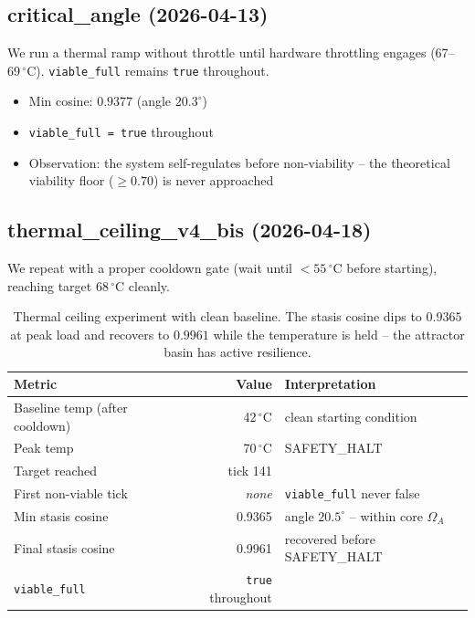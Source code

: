 \documentclass[11pt, a4paper]{article}
\begin{document}
\subsection{critical\_angle (2026-04-13)}

We run a thermal ramp without throttle until hardware throttling engages
(67--69\,$^\circ$C).
\texttt{viable\_full} remains \texttt{true} throughout.
\begin{itemize}
  \item Min cosine: $0.9377$ (angle $20.3^\circ$)
  \item \texttt{viable\_full = true} throughout
  \item Observation: the system self-regulates before non-viability --
        the theoretical viability floor ($\ge 0.70$) is never approached
\end{itemize}

\subsection{thermal\_ceiling\_v4\_bis (2026-04-18)}

We repeat with a proper cooldown gate (wait until $< 55\,^\circ\mathrm{C}$
before starting), reaching target $68\,^\circ\mathrm{C}$ cleanly.

\begin{table}[!htb]
\centering
\begin{tabular}{lrl}
\toprule
Metric & Value & Interpretation \\
\midrule
Baseline temp (after cooldown) & 42\,$^\circ$C & clean starting condition \\
Peak temp & 70\,$^\circ$C & SAFETY\_HALT \\
Target reached & tick 141 & \\
First non-viable tick & \textit{none} & \texttt{viable\_full} never false \\
Min stasis cosine & 0.9365 & angle $20.5^\circ$ -- within core $\Omega_A$ \\
Final stasis cosine & 0.9961 & recovered before SAFETY\_HALT \\
\texttt{viable\_full} & \texttt{true} throughout & \\
\bottomrule
\end{tabular}
\caption{Thermal ceiling experiment with clean baseline.
The stasis cosine dips to $0.9365$ at peak load and recovers to $0.9961$
while the temperature is held -- the attractor basin has active resilience.}
\label{tab:ceiling}
\end{table}
\end{document}
